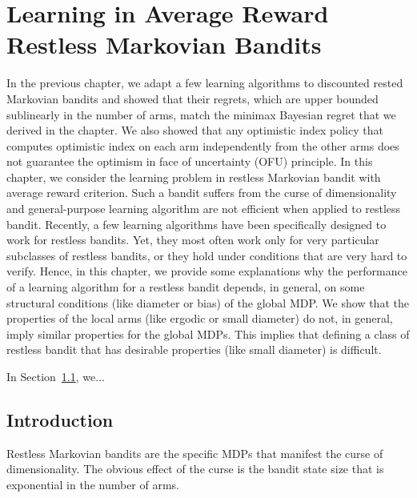 \begingroup
\let\clearpage\relax

\chapter{Learning in Average Reward Restless Markovian Bandits}
\label{ch:learning_restless}

In the previous chapter, we adapt a few learning algorithms to discounted rested Markovian bandits and showed that their regrets, which are upper bounded sublinearly in the number of arms, match the minimax Bayesian regret that we derived in the chapter.
We also showed that any optimistic index policy that computes optimistic index on each arm independently from the other arms does not guarantee the optimism in face of uncertainty (OFU) principle.
In this chapter, we consider the learning problem in restless Markovian bandit with average reward criterion.
Such a bandit suffers from the curse of dimensionality and general-purpose learning algorithm are not efficient when applied to restless bandit. Recently, a few learning algorithms have been specifically designed to work for restless bandits. Yet, they most often work only for very particular subclasses of restless bandits, or they hold under conditions that are very hard to verify.
Hence, in this chapter, we provide some explanations why the performance of a learning algorithm for a restless bandit depends, in general, on some structural conditions (like diameter or bias) of the global MDP. We show that the properties of the local arms (like ergodic or small diameter) do not, in general, imply similar properties for the global MDPs. This implies that defining a class of restless bandit that has desirable properties (like small diameter) is difficult. 

In Section~\ref{}, we...

\section{Introduction}

Restless Markovian bandits are the specific MDPs that manifest the curse of dimensionality.
The obvious effect of the curse is the bandit state size that is exponential in the number of arms.

